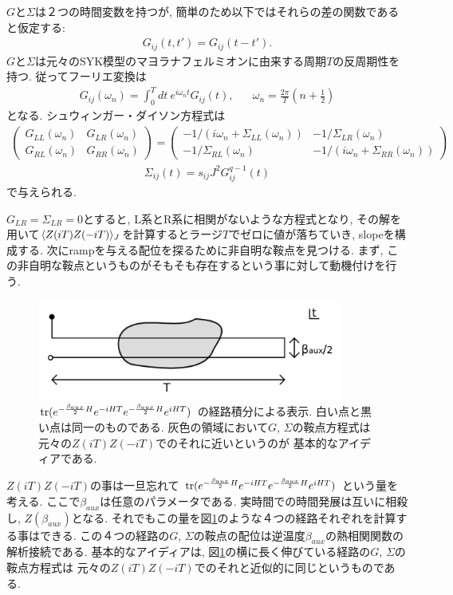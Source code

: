 $G$と$\Sigma$は２つの時間変数を持つが, 簡単のため以下ではそれらの差の関数であると仮定する:
\begin{align}
	G_{ij}(t, t') = G_{ij}(t - t').
\end{align}
$G$と$\Sigma$は元々のSYK模型のマヨラナフェルミオンに由来する周期$T$の反周期性を持つ. 
従ってフーリエ変換は
\begin{align}
	G_{ij}(\omega_n) = \int_0^T dt\ e^{i\omega_nt}G_{ij}(t),
	\hspace{20pt}\omega_n = \frac{2\pi}{T}\left(n + \frac{1}{2}\right)
\end{align}
となる. 
シュウィンガー・ダイソン方程式は
\begin{align}
	\begin{pmatrix}
		G_{LL}(\omega_n) & G_{LR}(\omega_n)\\
		G_{RL}(\omega_n) & G_{RR}(\omega_n)
	\end{pmatrix}
	=
	\begin{pmatrix}
		-1/(i\omega_n + \Sigma_{LL}(\omega_n)) & -1/\Sigma_{LR}(\omega_n)\\
		-1/\Sigma_{RL}(\omega_n) & -1/(i\omega_n + \Sigma_{RR}(\omega_n))
	\end{pmatrix}
	\label{eq:replica_SDeq_1}
\end{align}
\begin{align}
	\Sigma_{ij}(t) = s_{ij}J^2G_{ij}^{q-1}(t)
	\label{eq:replica_SDeq_2}
\end{align}
で与えられる. 

$G_{LR} = \Sigma_{LR} = 0$とすると, L系とR系に相関がないような方程式となり, 
その解を用いて$\langle Z(iT)Z(-iT) \rangle_J$を計算するとラージ$T$でゼロに値が落ちていき, 
slopeを構成する. 
次にrampを与える配位を探るために非自明な鞍点を見つける. 
まず, この非自明な鞍点というものがそもそも存在するという事に対して動機付けを行う. 

\begin{figure}[ht]
	\centering
	\includegraphics[width=10cm]{figures/beta_aux}
	\caption{$\mathrm{tr}(e^{-\frac{\beta_{aux}}{2}H}e^{-iHT}e^{-\frac{\beta_{aux}}{2}H}e^{iHT})$
		の経路積分による表示. 白い点と黒い点は同一のものである. 
		灰色の領域において$G$, $\Sigma$の鞍点方程式は元々の$Z(iT)Z(-iT)$でのそれに近いというのが
		基本的なアイディアである. 
	}
	\label{fig:beta_aux}
\end{figure}
$Z(iT)Z(-iT)$の事は一旦忘れて
$\mathrm{tr}(e^{-\frac{\beta_{aux}}{2}H}e^{-iHT}e^{-\frac{\beta_{aux}}{2}H}e^{iHT})$
という量を考える. ここで$\beta_{aux}$は任意のパラメータである. 
実時間での時間発展は互いに相殺し, $Z(\beta_{aux})$となる. 
それでもこの量を図\ref{fig:beta_aux}のような４つの経路それぞれを計算する事はできる. 
この４つの経路の$G$, $\Sigma$の鞍点の配位は逆温度$\beta_{aux}$の熱相関関数の解析接続である. 
基本的なアイディアは, 図\ref{fig:beta_aux}の横に長く伸びている経路の$G$, $\Sigma$の鞍点方程式は
元々の$Z(iT)Z(-iT)$でのそれと近似的に同じというものである. 

